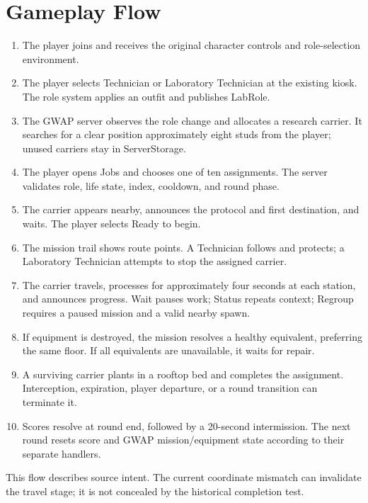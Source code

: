\section{Gameplay Flow}
\begin{enumerate}
\item The player joins and receives the original character controls and role-selection environment.\allowbreak{}
\item The player selects Technician or Laboratory Technician at the existing kiosk.\allowbreak{} The role system applies an outfit and publishes LabRole.\allowbreak{}
\item The GWAP server observes the role change and allocates a research carrier.\allowbreak{} It searches for a clear position approximately eight studs from the player; unused carriers stay in ServerStorage.\allowbreak{}
\item The player opens Jobs and chooses one of ten assignments.\allowbreak{} The server validates role, life state, index, cooldown, and round phase.\allowbreak{}
\item The carrier appears nearby, announces the protocol and first destination, and waits.\allowbreak{} The player selects Ready to begin.\allowbreak{}
\item The mission trail shows route points.\allowbreak{} A Technician follows and protects; a Laboratory Technician attempts to stop the assigned carrier.\allowbreak{}
\item The carrier travels, processes for approximately four seconds at each station, and announces progress.\allowbreak{} Wait pauses work; Status repeats context; Regroup requires a paused mission and a valid nearby spawn.\allowbreak{}
\item If equipment is destroyed, the mission resolves a healthy equivalent, preferring the same floor.\allowbreak{} If all equivalents are unavailable, it waits for repair.\allowbreak{}
\item A surviving carrier plants in a rooftop bed and completes the assignment.\allowbreak{} Interception, expiration, player departure, or a round transition can terminate it.\allowbreak{}
\item Scores resolve at round end, followed by a 20-second intermission.\allowbreak{} The next round resets score and GWAP mission/\allowbreak{}equipment state according to their separate handlers.\allowbreak{}
\end{enumerate}

This flow describes source intent.\allowbreak{} The current coordinate mismatch can invalidate the travel stage; it is not concealed by the historical completion test.\allowbreak{}

